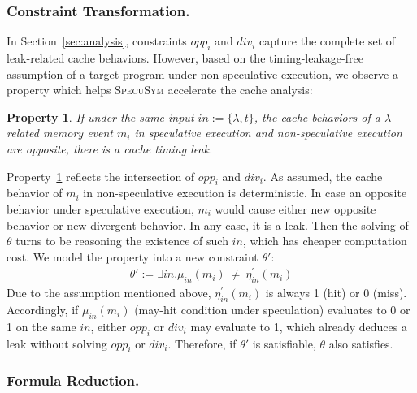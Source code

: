 \documentclass[sigconf]{acmart}
\newcommand{\SpecuSym}{\textsc{SpecuSym} }
\newtheorem{pro}{Property}
\begin{document}
\subsubsection{Constraint Transformation.}
In Section~\ref{sec:analysis}, constraints $\mathit{opp_i}$ and $\mathit{div_i}$
capture the complete set of leak-related cache behaviors. However, based on the
timing-leakage-free assumption of a target program under non-speculative execution,
we observe a property which helps \SpecuSym accelerate the cache analysis:
%
\begin{pro}
  \label{pro:p2}
  If under the same input $\mathit{in:=\{\lambda,t\}}$, the cache behaviors of a 
	$\lambda$-related	memory event $\mathit{m_i}$ in speculative execution and 
	non-speculative execution are opposite, there is a cache timing leak. 
\end{pro}
%
Property~\ref{pro:p2} reflects the intersection of $\mathit{opp_i}$ and 
$\mathit{div_i}$. As assumed, the cache behavior of $\mathit{m_i}$ in 
non-speculative execution is deterministic. In case an opposite behavior 
under speculative execution, $\mathit{m_i}$ would cause either new opposite 
behavior or new divergent behavior. In any case, it is a leak. Then the 
solving of $\theta$ turns to be reasoning the existence of such $\mathit{in}$, 
which has cheaper computation cost. We model the property into a new constraint 
$\theta'$:  
%
\begin{multline}
  \label{eqn:leak}
  ~~~~~~~~~~~~~~~
  \theta':=
  \exists\mathit{in}.
  \mathit{
    \mu_{in}(m_i)~\neq~\eta_{in}^\prime(m_i)
  }
  ~~~~~~~~~~~~~~~
\end{multline}
%
Due to the assumption mentioned above, $\mathit{\eta_{in}^\prime(m_i)}$ 
is always 1 (hit) or 0 (miss). Accordingly, if $\mathit{\mu_{in}(m_i)}$
(may-hit condition under speculation) evaluates to 0 or 1 on the same 
$\mathit{in}$, either $\mathit{opp_i}$ or $\mathit{div_i}$ may evaluate 
to 1, which already deduces a leak without solving $\mathit{opp_i}$ or 
$\mathit{div_i}$. Therefore, if $\theta'$ is satisfiable, $\theta$ also 
satisfies. 


\subsubsection{Formula Reduction.}
\end{document}
